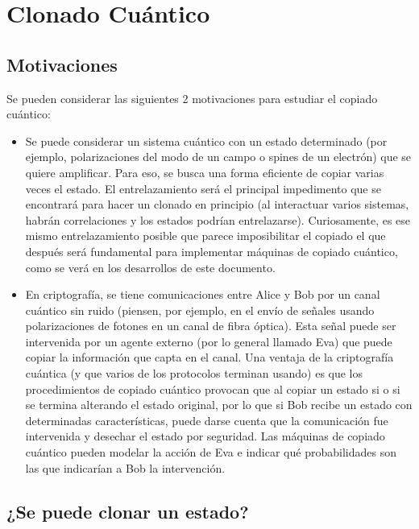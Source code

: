 \documentclass{book}
\begin{document}
\chapter{Clonado Cuántico}
 \section{Motivaciones}
Se pueden considerar las siguientes 2 motivaciones para estudiar el copiado cuántico:
\begin{itemize} 
\item Se puede considerar un sistema cuántico con un estado determinado (por ejemplo, polarizaciones del modo de un campo o spines de un electrón) que se quiere amplificar. Para eso, se busca una forma eficiente de copiar varias veces el estado. El entrelazamiento será el principal impedimento que se encontrará para hacer un clonado en principio (al interactuar varios sistemas, habrán correlaciones y los estados podrían entrelazarse). Curiosamente, es ese mismo entrelazamiento posible que parece imposibilitar el copiado el que después será fundamental para implementar máquinas de copiado cuántico, como se verá en los desarrollos de este documento. 
\item En criptografía, se tiene comunicaciones entre Alice y Bob por un canal cuántico sin ruido (piensen, por ejemplo, en el envío de señales usando polarizaciones de fotones en un canal de fibra óptica). Esta señal puede ser intervenida por un agente externo (por lo general llamado Eva) que puede copiar la información que capta en el canal. Una ventaja de la criptografía cuántica (y que varios de los protocolos terminan usando) es que los procedimientos de copiado cuántico provocan que al copiar un estado si o si se termina alterando el estado original, por lo que si Bob recibe un estado con determinadas características, puede darse cuenta que la comunicación fue intervenida y desechar el estado por seguridad. Las máquinas de copiado cuántico pueden modelar la acción de Eva e indicar qué probabilidades son las que indicarían a Bob la intervención. \end{itemize}
\section{¿Se puede clonar un estado?}
\end{document}
